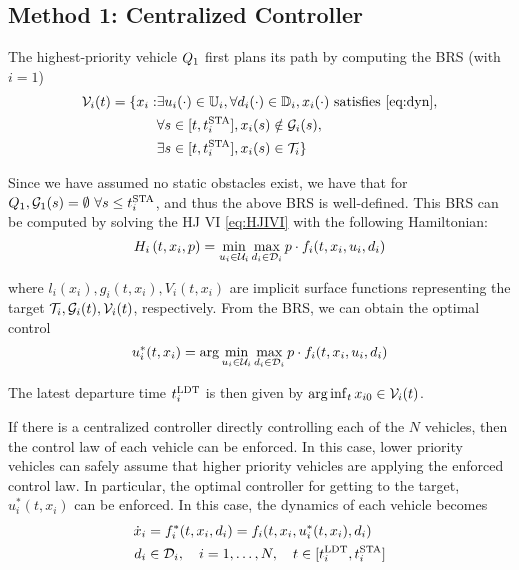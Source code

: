 \subsection{Method 1: Centralized Controller \label{sec:cc}}
The highest-priority vehicle $Q_1$ first plans its path by computing the BRS (with $i=1$)
\vspace{-0.3em}
\begin{equation}
\label{eq:BRS}
\begin{aligned}
\mathcal{V}_i(t) = \{x_i: &\exists u_i(\cdot) \in \mathbb{U}_i, \forall d_i(\cdot) \in \mathbb{D}_i, x_i(\cdot) \text{ satisfies \eqref{eq:dyn}}, \\
&\forall s \in [t, t^\text{STA}_i], x_i(s) \notin \mathcal{G}_i(s), \\
&\exists s \in [t, t^\text{STA}_i], x_i(s) \in \mathcal{T}_i\}
\end{aligned}
\end{equation}

Since we have assumed no static obstacles exist, we have that for $Q_1, \mathcal{G}_1(s)=\emptyset ~ \forall s \le t^\text{STA}_i$, and thus the above BRS is well-defined. This BRS can be computed by solving the HJ VI \eqref{eq:HJIVI} with the following Hamiltonian:
\vspace{-0.3em}
\begin{equation}
H_i\left(t, x_i, p\right) = \min_{u_i \in \mathcal{U}_i} \max_{d_i \in \mathcal{D}_i} p \cdot f_i(t, x_i, u_i, d_i)
\end{equation}

\noindent where $l_i(x_i), g_i(t,x_i),V_i(t,x_i)$ are implicit surface functions representing the target $\mathcal{T}_i, \mathcal{G}_i(t), \mathcal{V}_i(t)$, respectively. From the BRS, we can obtain the optimal control
\vspace{-0.3em}
\begin{equation}
\label{eq:opt_ctrl_i}
u_i^*(t,x_i) =  \arg \min_{u_i \in \mathcal{U}_i} \max_{d_i \in \mathcal{D}_i} p \cdot f_i(t, x_i, u_i, d_i)
\end{equation}

The latest departure time $t^\text{LDT}_i$ is then given by $\arg \inf_t x_{i0} \in \mathcal{V}_i(t)$.

If there is a centralized controller directly controlling each of the $N$ vehicles, then the control law of each vehicle can be enforced. In this case, lower priority vehicles can safely assume that higher priority vehicles are applying the enforced control law. In particular, the optimal controller for getting to the target, $u^*_i(t, x_i)$ can be enforced. In this case, the dynamics of each vehicle becomes 
\vspace{-0.3em}
\begin{equation}
\label{eq:dyn_cc}
\begin{aligned}
\dot x_i &= f^*_i (t, x_i, d_i) = f_i(t, x_i, u^*_i(t,x_i), d_i) \\
d_i &\in \mathcal{D}_i, \quad i = 1,\ldots, N, \quad t \in [t^\text{LDT}_i, t^\text{STA}_i]
\end{aligned}
\end{equation}

